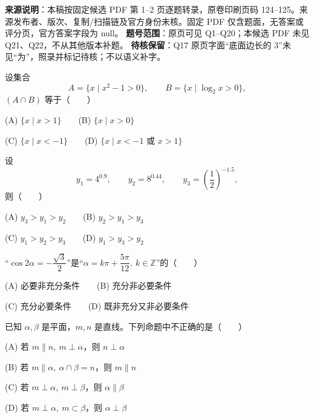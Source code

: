 

\begin{gktip}
\textbf{来源说明}：本稿按固定候选 PDF 第 1–2 页逐题转录，原卷印刷页码 124–125。来源发布者、版次、复制/扫描链及官方身份未核。固定 PDF 仅含题面，无答案或评分页，官方答案字段为 null。
\textbf{题号范围}：原页可见 Q1–Q20；本候选 PDF 未见 Q21、Q22，不从其他版本补题。
\textbf{待核保留}：Q17 原页字面“底面边长的 3”未见“为”，照录并标记待核；不以语义补字。
\end{gktip}


\begin{question}
设集合
\nopagebreak[4]
\[
   A=\{x\mid x^2-1>0\},\qquad B=\{x\mid \log_2x>0\},
\]
   \((A\cap B)\) 等于\mbox{（　　）}

   (A) \(\{x\mid x>1\}\)　　(B) \(\{x\mid x>0\}\)

   (C) \(\{x\mid x<-1\}\)　　(D) \(\{x\mid x<-1\text{ 或 }x>1\}\)

\end{question}
\begin{question}
设
\nopagebreak[4]
\[
   y_1=4^{0.9},\qquad y_2=8^{0.44},\qquad y_3=\left(\frac12\right)^{-1.5},
\]
   则\mbox{（　　）}

   (A) \(y_3>y_1>y_2\)　　(B) \(y_2>y_1>y_3\)

   (C) \(y_1>y_2>y_3\)　　(D) \(y_1>y_3>y_2\)

\end{question}
\begin{question}
“\(\cos 2\alpha=-\dfrac{\sqrt3}{2}\)”是“\(\alpha=k\pi+\dfrac{5\pi}{12},\ k\in\mathbb Z\)”的\mbox{（　　）}

   (A) 必要非充分条件　　(B) 充分非必要条件

   (C) 充分必要条件　　(D) 既非充分又非必要条件

\end{question}
\begin{question}
已知 \(\alpha,\beta\) 是平面，\(m,n\) 是直线。下列命题中不正确的是\mbox{（　　）}

   (A) 若 \(m\parallel n,\ m\perp\alpha\)，则 \(n\perp\alpha\)

   (B) 若 \(m\parallel\alpha,\ \alpha\cap\beta=n\)，则 \(m\parallel n\)

   (C) 若 \(m\perp\alpha,\ m\perp\beta\)，则 \(\alpha\parallel\beta\)

   (D) 若 \(m\perp\alpha,\ m\subset\beta\)，则 \(\alpha\perp\beta\)

\end{question}
